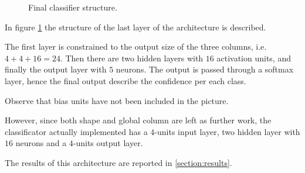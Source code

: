 \begin{figure}
            \caption{Final classifier structure.}\label{fig:mc-cnn:final-classifier-structure}
        \end{figure}
        \par{
            In figure \ref{fig:mc-cnn:final-classifier-structure} the structure of the last layer of the architecture is described.
        }
        \par{
            The first layer is constrained to the output size of the three columns, i.e. $4+4+16 = 24$. Then there are two hidden layers with $16$ activation units, and finally the output layer with $5$ neurons. The output is passed through a softmax layer, hence the final output describe the confidence per each class.
        }
        \par{
            Observe that bias units have not been included in the picture.
        }
        \par{
            However, since both shape and global column are left as further work, the classificator actually implemented has a $4$-units input layer, two hidden layer with $16$ neurons and a $4$-units output layer.
        }
        \par{
            The results of this architecture are reported in \ref{section:results}.
        }
